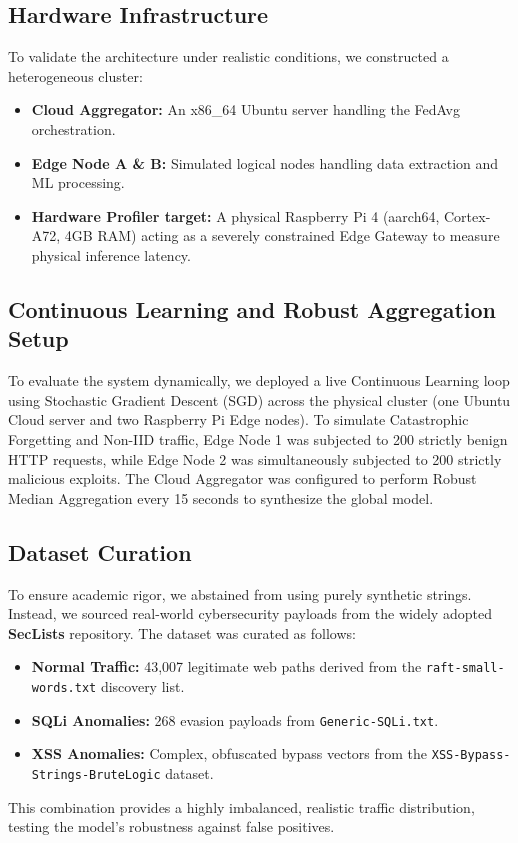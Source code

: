 \documentclass[conference]{IEEEtran}
\begin{document}
\subsection{Hardware Infrastructure}
To validate the architecture under realistic conditions, we constructed a heterogeneous cluster:
\begin{itemize}
    \item \textbf{Cloud Aggregator:} An x86\_64 Ubuntu server handling the FedAvg orchestration.
    \item \textbf{Edge Node A \& B:} Simulated logical nodes handling data extraction and ML processing.
    \item \textbf{Hardware Profiler target:} A physical Raspberry Pi 4 (aarch64, Cortex-A72, 4GB RAM) acting as a severely constrained Edge Gateway to measure physical inference latency.
\end{itemize}

\subsection{Continuous Learning and Robust Aggregation Setup}
To evaluate the system dynamically, we deployed a live Continuous Learning loop using Stochastic Gradient Descent (SGD) across the physical cluster (one Ubuntu Cloud server and two Raspberry Pi Edge nodes). To simulate Catastrophic Forgetting and Non-IID traffic, Edge Node 1 was subjected to 200 strictly benign HTTP requests, while Edge Node 2 was simultaneously subjected to 200 strictly malicious exploits. The Cloud Aggregator was configured to perform Robust Median Aggregation every 15 seconds to synthesize the global model.

\subsection{Dataset Curation}
To ensure academic rigor, we abstained from using purely synthetic strings. Instead, we sourced real-world cybersecurity payloads from the widely adopted \textbf{SecLists} repository. 
The dataset was curated as follows:
\begin{itemize}
    \item \textbf{Normal Traffic:} 43,007 legitimate web paths derived from the \texttt{raft-small-words.txt} discovery list.
    \item \textbf{SQLi Anomalies:} 268 evasion payloads from \texttt{Generic-SQLi.txt}.
    \item \textbf{XSS Anomalies:} Complex, obfuscated bypass vectors from the \texttt{XSS-Bypass-Strings-BruteLogic} dataset.
\end{itemize}
This combination provides a highly imbalanced, realistic traffic distribution, testing the model's robustness against false positives.
\end{document}
